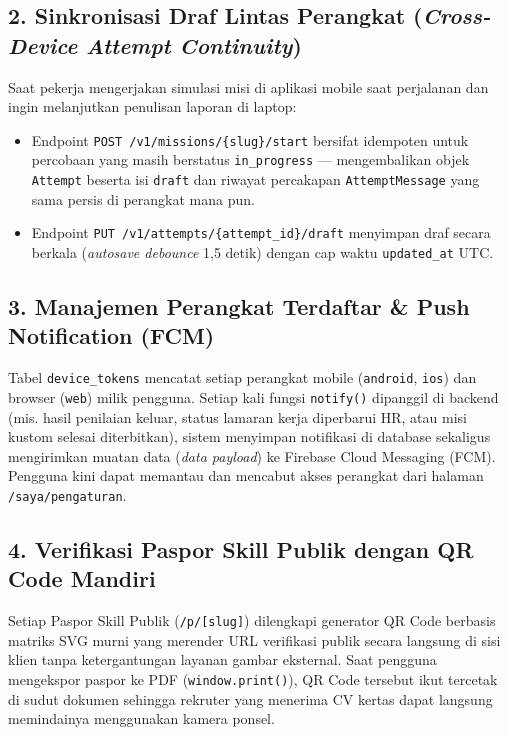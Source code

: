 \documentclass[11pt,a4paper]{report}
\begin{document}
\subsection{2. Sinkronisasi Draf Lintas Perangkat (\textit{Cross-Device Attempt Continuity})}
Saat pekerja mengerjakan simulasi misi di aplikasi mobile saat perjalanan dan ingin melanjutkan penulisan laporan di laptop:
\begin{itemize}[leftmargin=1.5em]
    \item Endpoint \texttt{POST /v1/missions/\{slug\}/start} bersifat idempoten untuk percobaan yang masih berstatus \texttt{in\_progress} --- mengembalikan objek \texttt{Attempt} beserta isi \texttt{draft} dan riwayat percakapan \texttt{AttemptMessage} yang sama persis di perangkat mana pun.
    \item Endpoint \texttt{PUT /v1/attempts/\{attempt\_id\}/draft} menyimpan draf secara berkala (\textit{autosave debounce} 1,5 detik) dengan cap waktu \texttt{updated\_at} UTC.
\end{itemize}

\subsection{3. Manajemen Perangkat Terdaftar \& Push Notification (FCM)}
Tabel \texttt{device\_tokens} mencatat setiap perangkat mobile (\texttt{android}, \texttt{ios}) dan browser (\texttt{web}) milik pengguna. Setiap kali fungsi \texttt{notify()} dipanggil di backend (mis. hasil penilaian keluar, status lamaran kerja diperbarui HR, atau misi kustom selesai diterbitkan), sistem menyimpan notifikasi di database sekaligus mengirimkan muatan data (\textit{data payload}) ke Firebase Cloud Messaging (FCM). Pengguna kini dapat memantau dan mencabut akses perangkat dari halaman \texttt{/saya/pengaturan}.

\subsection{4. Verifikasi Paspor Skill Publik dengan QR Code Mandiri}
Setiap Paspor Skill Publik (\texttt{/p/[slug]}) dilengkapi generator QR Code berbasis matriks SVG murni yang merender URL verifikasi publik secara langsung di sisi klien tanpa ketergantungan layanan gambar eksternal. Saat pengguna mengekspor paspor ke PDF (\texttt{window.print()}), QR Code tersebut ikut tercetak di sudut dokumen sehingga rekruter yang menerima CV kertas dapat langsung memindainya menggunakan kamera ponsel.
\end{document}
